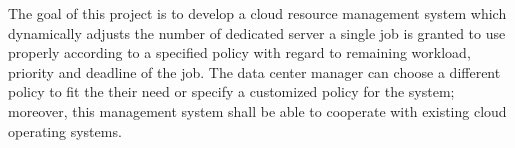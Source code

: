 \documentclass[11pt]{article}
\begin{document}
The goal of this project is to develop a cloud resource management
system which dynamically adjusts the number of dedicated server a single
job is granted to use properly according to a specified policy with
regard to remaining workload, priority and deadline of the job. The data
center manager can choose a different policy to fit the their need or
specify a customized policy for the system; moreover, this management
system shall be able to cooperate with existing cloud operating systems.


\renewcommand\refname{Reference}


\end{document}
